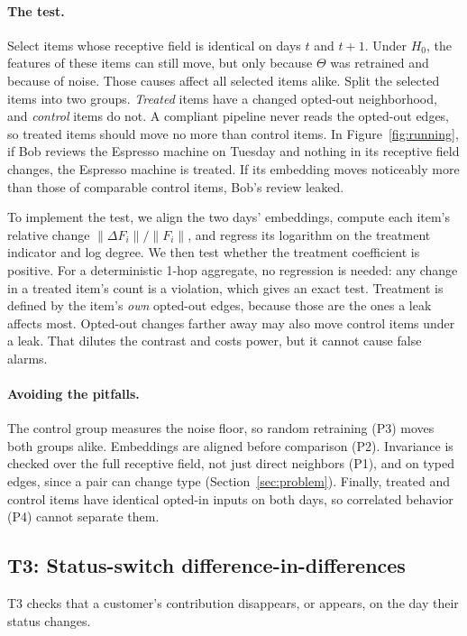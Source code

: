 \documentclass[10pt,twocolumn,letterpaper]{article}
\theoremstyle{definition}
\begin{document}
\paragraph{The test.}
Select items whose receptive field is identical on days $t$ and $t{+}1$. Under
$H_0$, the features of these items can still move, but only because $\Theta$ was
retrained and because of noise. Those causes affect all selected items
alike. Split the selected items into two groups. \emph{Treated} items have a
changed opted-out neighborhood, and \emph{control} items do not. A compliant
pipeline never reads the opted-out edges, so treated items should move no
more than control items. In Figure~\ref{fig:running}, if Bob reviews the
Espresso machine on Tuesday and nothing in its receptive field changes, the
Espresso machine is treated. If its embedding moves noticeably more than those
of comparable control items, Bob's review leaked.

To implement the test, we align the two days' embeddings, compute each
item's relative change $\|\Delta F_i\|/\|F_i\|$, and regress its logarithm on
the treatment indicator and log degree. We then test whether the treatment
coefficient is positive. For a deterministic 1-hop aggregate, no regression
is needed: any change in a treated item's count is a violation, which gives an
exact test. Treatment is defined by the item's \emph{own} opted-out edges,
because those are the ones a leak affects most. Opted-out changes farther away
may also move control items under a leak. That dilutes the contrast and costs
power, but it cannot cause false alarms.

\paragraph{Avoiding the pitfalls.}
The control group measures the noise floor, so random retraining (P3) moves
both groups alike. Embeddings are aligned before comparison (P2). Invariance is
checked over the full receptive field, not just direct neighbors (P1), and on
typed edges, since a pair can change type (Section~\ref{sec:problem}). Finally, treated and control items have identical opted-in
inputs on both days, so correlated behavior (P4) cannot separate them.

\subsection{T3: Status-switch difference-in-differences}
T3 checks that a customer's contribution disappears, or appears, on the day
their status changes.
\end{document}
